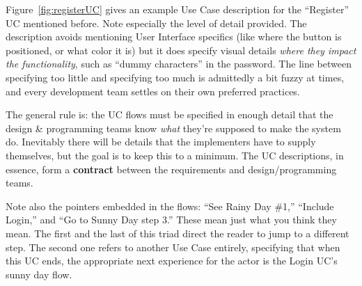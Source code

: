 Figure~\ref{fig:registerUC} gives an example Use Case description for the
``Register'' UC mentioned before. Note especially the level of detail
provided. The description avoids mentioning User Interface specifics (like
where the button is positioned, or what color it is) but it does specify
visual details \textit{where they impact the functionality}, such as ``dummy
characters'' in the password. The line between specifying too little and
specifying too much is admittedly a bit fuzzy at times, and every development
team settles on their own preferred practices.

The general rule is: the UC flows must be specified in enough detail that the
design \& programming teams know \textit{what} they're supposed to make the
system do. Inevitably there will be details that the implementers have to
supply themselves, but the goal is to keep this to a minimum. The UC
descriptions, in essence, form a \textbf{contract} between the requirements
and design/programming teams.

Note also the pointers embedded in the flows: ``See Rainy Day \#1,'' ``Include
Login,'' and ``Go to Sunny Day step 3.'' These mean just what you think they
mean. The first and the last of this triad direct the reader to jump to a
different step. The second one refers to another Use Case entirely, specifying
that when this UC ends, the appropriate next experience for the actor is the
Login UC's sunny day flow.

